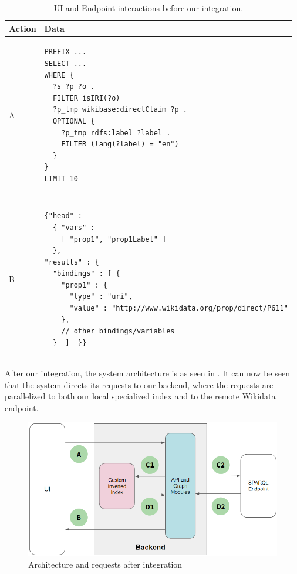 \begin{table}[h]
\centering
\begin{tabular}{ll}
Action & Data \\ 
\hline
A              
& \begin{minipage}[t]{0.85\linewidth}
\begin{verbatim}
PREFIX ...
SELECT ... 
WHERE {
  ?s ?p ?o .
  FILTER isIRI(?o)
  ?p_tmp wikibase:directClaim ?p .
  OPTIONAL {
    ?p_tmp rdfs:label ?label .
    FILTER (lang(?label) = "en")
  } 
} 
LIMIT 10
\end{verbatim}
\end{minipage}
\\ \\ \\
B             
& \begin{minipage}[t]{0.85\linewidth}
\begin{verbatim}
{"head" : 
  { "vars" : 
    [ "prop1", "prop1Label" ] 
  },
"results" : {
  "bindings" : [ {
    "prop1" : {
      "type" : "uri",
      "value" : "http://www.wikidata.org/prop/direct/P611"
    }, 
    // other bindings/variables
  }  ]  }}
\end{verbatim}
\end{minipage}
\\
\end{tabular}
\caption{UI and Endpoint interactions before our integration.}
\label{table:uiBeforeRequest}
\end{table}

After our integration, the system architecture is as seen in . It can now be seen that the system directs its requests to our backend, where the requests are parallelized to both our local specialized index and to the remote Wikidata endpoint.

\begin{figure}[h]
    \centering
        \includegraphics[width=\linewidth]{imagenes/uiAfterRequest.png}
        \caption{Architecture and requests after integration}
        \label{fig:uiAfterArchitecture}
\end{figure}

